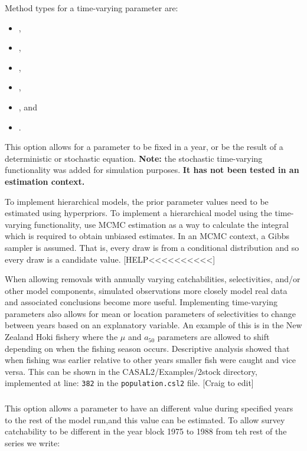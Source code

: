 Method types for a time-varying parameter are: 

\begin{itemize}
\item {},
\item {},
\item {},
\item {},
\item {}, and
\item {}.
\end{itemize}

This option allows for a parameter to be fixed in a year, or be the result of a deterministic or stochastic equation. \textbf{Note:} the stochastic time-varying functionality was added for simulation purposes. \textbf{It has not been tested in an estimation context.}

To implement hierarchical models, the prior parameter values need to be estimated using hyperpriors. To implement a hierarchical model using the time-varying functionality, use MCMC estimation as a way to calculate the integral which is required to obtain unbiased estimates. In an MCMC context, a Gibbs sampler is assumed. That is, every draw is from a conditional distribution and so every draw is a candidate value.  [HELP<<<<<<<<<<]

When allowing removals with annually varying catchabilities, selectivities, and/or other model components, simulated observations more closely model real data and associated conclusions become more useful. Implementing time-varying parameters also allows for mean or location parameters of selectivities to change between years based on an explanatory variable. An example of this is in the New Zealand Hoki fishery where the $\mu$ and $a_{50}$ parameters are allowed to shift depending on when the fishing season occurs. Descriptive analysis showed that when fishing was earlier relative to other years smaller fish were caught and vice versa. This can be shown in the CASAL2/Examples/2stock directory, implemented at line: \texttt{382} in the \texttt{population.csl2} file. [Craig to edit]

\subsubsection[Constant (year blocks)]{}

This option allows a parameter to have an different value during specified years to the rest of the model run,and this value can be estimated. To allow survey catchability to be different in the year block 1975 to 1988 from teh rest of the series we write:

